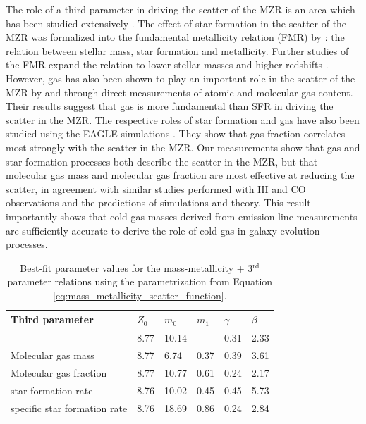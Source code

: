 \documentclass[fleqn,usenatbib]{mnras}
\begin{document}
The role of a third parameter in driving the scatter of the MZR is an area which has been studied extensively \citep[e.g.][]{ellison2008}. The effect of star formation in the scatter of the MZR was formalized into the fundamental metallicity relation (FMR) by \cite{mannucci2010}: the relation between stellar mass, star formation and metallicity. Further studies of the FMR expand the relation to lower stellar masses and higher redshifts \citep{mannucci2011, cresci2019, curti2020}. However, gas has also been shown to play an important role in the scatter of the MZR by \cite{brinchmann2013, bothwell2013, bothwell2016, lara-lopez2013, hughes2013} and \cite{brown2018} through direct measurements of atomic and molecular gas content. Their results suggest that gas is more fundamental than SFR in  driving the scatter in the MZR. The respective roles of star formation and gas have also been studied using the EAGLE simulations \citep{loon2021}. They show that gas fraction correlates most strongly with the scatter in the MZR. Our measurements show that gas and star formation processes both describe the scatter in the MZR, but that molecular gas mass and molecular gas fraction are most effective at reducing the scatter, in agreement with similar studies performed with HI and CO observations and the predictions of simulations and theory. 
This result importantly shows that cold gas masses derived from emission line measurements are sufficiently accurate to derive the role of cold gas in galaxy evolution processes. 

\begin{table}
 \centering
 \caption{Best-fit parameter values for the mass-metallicity + 3$^{\textrm{rd}}$ parameter relations using the parametrization from Equation \ref{eq:mass_metallicity_scatter_function}.}
 \label{tab:mzr_best_fits}
\begin{tabular}{llllll}
\hline
\hline
\textbf{Third parameter}      & \textbf{$Z_0$} & \textbf{$m_0$} & \textbf{$m_1$} & \textbf{$\gamma$} & \textbf{$\beta$} \\ \hline
---                           & 8.77           & 10.14          & ---            & 0.31              & 2.33             \\
Molecular gas mass            & 8.77           & 6.74           & 0.37           & 0.39              & 3.61             \\
Molecular gas fraction        & 8.77           & 10.77          & 0.61           & 0.24              & 2.17             \\
star formation rate           & 8.76           & 10.02          & 0.45           & 0.45              & 5.73             \\
specific star formation rate  & 8.76           & 18.69          & 0.86           & 0.24              & 2.84             \\
\hline
\end{tabular}
\end{table}
\end{document}
